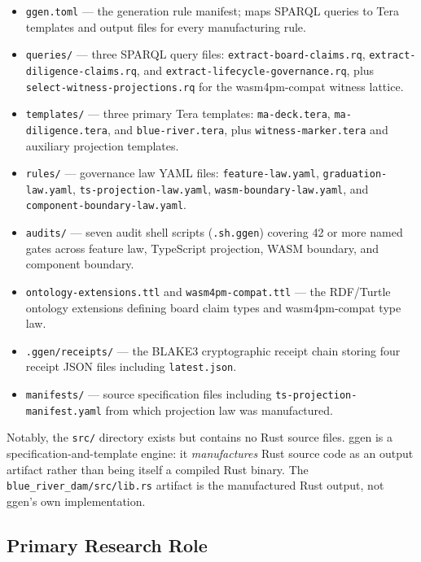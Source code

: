 \begin{itemize}
  \item \texttt{ggen.toml} --- the generation rule manifest; maps SPARQL queries to Tera
    templates and output files for every manufacturing rule.
  \item \texttt{queries/} --- three SPARQL query files: \texttt{extract-board-claims.rq},
    \texttt{extract-diligence-claims.rq}, and \texttt{extract-lifecycle-governance.rq}, plus
    \texttt{select-witness-projections.rq} for the wasm4pm-compat witness lattice.
  \item \texttt{templates/} --- three primary Tera templates: \texttt{ma-deck.tera},
    \texttt{ma-diligence.tera}, and \texttt{blue-river.tera}, plus \texttt{witness-marker.tera}
    and auxiliary projection templates.
  \item \texttt{rules/} --- governance law YAML files: \texttt{feature-law.yaml},
    \texttt{graduation-law.yaml}, \texttt{ts-projection-law.yaml},
    \texttt{wasm-boundary-law.yaml}, and \texttt{component-boundary-law.yaml}.
  \item \texttt{audits/} --- seven audit shell scripts (\texttt{.sh.ggen}) covering 42 or more
    named gates across feature law, TypeScript projection, WASM boundary, and component boundary.
  \item \texttt{ontology-extensions.ttl} and \texttt{wasm4pm-compat.ttl} --- the RDF/Turtle
    ontology extensions defining board claim types and wasm4pm-compat type law.
  \item \texttt{.ggen/receipts/} --- the BLAKE3 cryptographic receipt chain storing four receipt
    JSON files including \texttt{latest.json}.
  \item \texttt{manifests/} --- source specification files including
    \texttt{ts-projection-manifest.yaml} from which projection law was manufactured.
\end{itemize}

Notably, the \texttt{src/} directory exists but contains no Rust source files. ggen is a
specification-and-template engine: it \emph{manufactures} Rust source code as an output artifact
rather than being itself a compiled Rust binary. The \texttt{blue\_river\_dam/src/lib.rs} artifact
is the manufactured Rust output, not ggen's own implementation.

\subsection{Primary Research Role}
\label{sec:ggen-identity-role}

